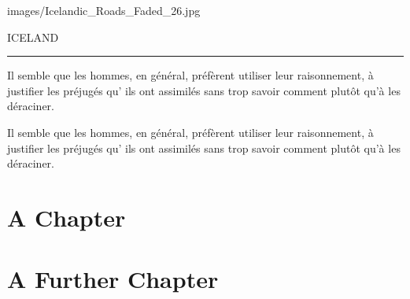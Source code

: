 \documentclass{RVTM}
\begin{document}
\begin{bpdp}{images/Icelandic_Roads_Faded_26.jpg}%
	\noindent%
	\begingroup
	\color{white}%
	\sffamily\bfseries%
	\vfill
	\begin{center}
		\fontsize{2cm}{2.4cm}\selectfont\highcontrastfont%
		ICELAND\\[1cm]
		\rule{.5\linewidth}{5mm}
	\end{center}
	
	\vfill%
	\noindent\lipsum[3]
	\vfill
	\vfill
	\endgroup
	
	\bpdpnewpage%
	\null%
	\vfill
	\hspace*{-1em}
	\vfill%
\end{bpdp}

\begin{quotationpage}
	Il semble que les hommes, en général, préfèrent utiliser leur raisonnement, à justifier les préjugés qu’ ils ont assimilés sans trop savoir comment plutôt qu'à les déraciner.
\end{quotationpage}

\begin{quotationpage}%
	Il semble que les hommes, en général, préfèrent utiliser leur raisonnement, à justifier les préjugés qu’ ils ont assimilés sans trop savoir comment plutôt qu'à les déraciner.
\end{quotationpage}

\setcounter{page}{30}
\chapter{A Chapter}
%
%
\setcounter{page}{36}
\chapter{A Further Chapter}
\end{document}

